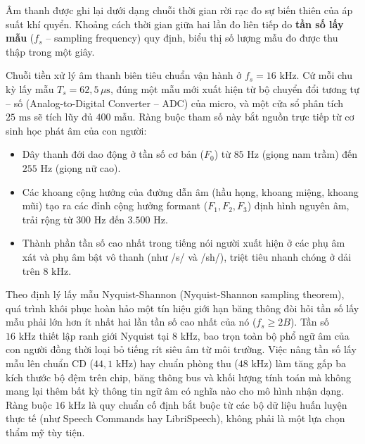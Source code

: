 \documentclass[11pt,a4paper]{article}
\begin{document}
Âm thanh được ghi lại dưới dạng chuỗi thời gian rời rạc đo sự biến thiên của áp suất khí quyển. Khoảng cách thời gian giữa hai lần đo liên tiếp do \textbf{tần số lấy mẫu} ($f_s$ -- sampling frequency) quy định, biểu thị số lượng mẫu đo được thu thập trong một giây.

Chuỗi tiền xử lý âm thanh biên tiêu chuẩn vận hành ở $f_s = 16\text{ kHz}$. Cứ mỗi chu kỳ lấy mẫu $T_s = 62{,}5\,\mu\text{s}$, đúng một mẫu mới xuất hiện từ bộ chuyển đổi tương tự -- số (Analog-to-Digital Converter -- ADC) của micro, và một cửa sổ phân tích $25\text{ ms}$ sẽ tích lũy đủ $400$ mẫu. Ràng buộc tham số này bắt nguồn trực tiếp từ cơ sinh học phát âm của con người:
\begin{itemize}\setlength{\itemsep}{-2.5pt}\setlength{\parsep}{0pt}\setlength{\topsep}{0pt}\setlength{\partopsep}{0pt}
    \item Dây thanh đới dao động ở tần số cơ bản ($F_0$) từ $85\text{ Hz}$ (giọng nam trầm) đến $255\text{ Hz}$ (giọng nữ cao).
    \item Các khoang cộng hưởng của đường dẫn âm (hầu họng, khoang miệng, khoang mũi) tạo ra các đỉnh cộng hưởng formant ($F_1, F_2, F_3$) định hình nguyên âm, trải rộng từ $300\text{ Hz}$ đến $3.500\text{ Hz}$.
    \item Thành phần tần số cao nhất trong tiếng nói người xuất hiện ở các phụ âm xát và phụ âm bật vô thanh (như /s/ và /sh/), triệt tiêu nhanh chóng ở dải trên $8\text{ kHz}$.
\end{itemize}

Theo định lý lấy mẫu Nyquist-Shannon (Nyquist-Shannon sampling theorem), quá trình khôi phục hoàn hảo một tín hiệu giới hạn băng thông đòi hỏi tần số lấy mẫu phải lớn hơn ít nhất hai lần tần số cao nhất của nó ($f_s \ge 2B$). Tần số $16\text{ kHz}$ thiết lập ranh giới Nyquist tại $8\text{ kHz}$, bao trọn toàn bộ phổ ngữ âm của con người đồng thời loại bỏ tiếng rít siêu âm từ môi trường. Việc nâng tần số lấy mẫu lên chuẩn CD ($44{,}1\text{ kHz}$) hay chuẩn phòng thu ($48\text{ kHz}$) làm tăng gấp ba kích thước bộ đệm trên chip, băng thông bus và khối lượng tính toán mà không mang lại thêm bất kỳ thông tin ngữ âm có nghĩa nào cho mô hình nhận dạng. Ràng buộc $16\text{ kHz}$ là quy chuẩn cố định bắt buộc từ các bộ dữ liệu huấn luyện thực tế (như Speech Commands hay LibriSpeech), không phải là một lựa chọn thẩm mỹ tùy tiện.

\clearpage

\end{document}
